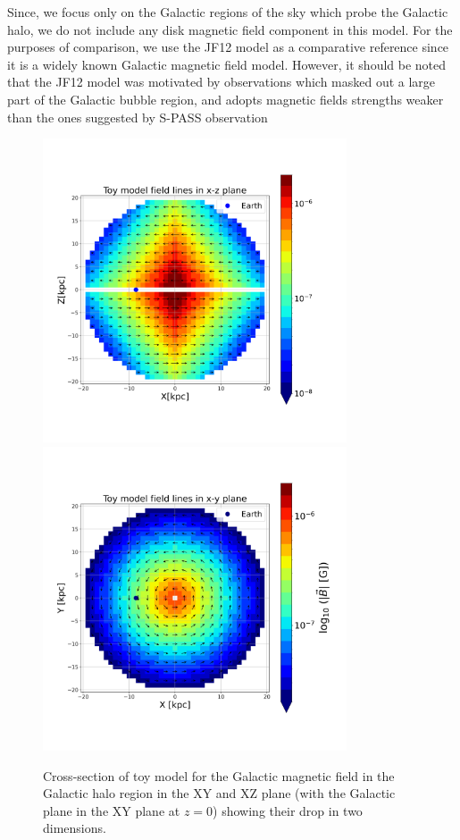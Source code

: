 \documentclass[12pt, a4 paper]{article}
\begin{document}
Since, we focus only on the Galactic regions of the sky which probe the Galactic halo, we do not include any disk magnetic field component in this model. For the purposes of comparison, we use the JF12 model as a comparative reference since it is a widely known Galactic magnetic field model.
However, it should be noted that the JF12 model was motivated by observations which masked out a large part of the Galactic bubble region, and adopts magnetic fields strengths weaker than the ones suggested by S-PASS observation \cite{Carretti_2013} \
\begin{figure}[h!]
    \centering
    \includegraphics[width = 9cm]{Images/ToyModel_BestFit_XZ.png}%
    \includegraphics[width = 9cm
    ]{Images/ToyModel_BestFit_XY.png}
    \caption{Cross-section of toy model for the Galactic magnetic field in the Galactic halo region in the XY and XZ plane (with the Galactic plane in the XY plane at $z=0$) showing their drop in two dimensions.}
    \label{fig:Vis_TM}
\end{figure}
\clearpage
\end{document}
